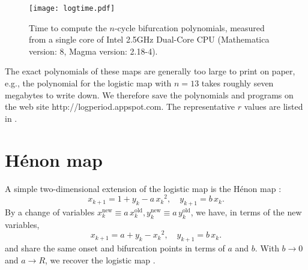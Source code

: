 \documentclass{ws-ijbc}
\begin{document}
\begin{figure}[h]
  \begin{center}
  \begin{minipage}{\linewidth}
        \texttt{[image: logtime.pdf]}
  \end{minipage}%
  \end{center}
  \caption{\label{fig:logtime}
  Time to compute the $n$-cycle bifurcation polynomials,
    measured from a single core of
    Intel\textsuperscript{\textregistered} 2.5GHz Dual-Core CPU
  (Mathematica version: 8, Magma version: 2.18-4).
  }
\end{figure}
%






%
The exact polynomials of these maps are generally too large to print on paper,
  e.g., the polynomial for the logistic map with $n = 13$
    takes roughly seven megabytes to write down.
%
We therefore save the polynomials and programs on the web site
http://logperiod.appspot.com.
%
The representative $r$ values are listed in .






\section{\label{sec:henon}H\'enon map}




A simple two-dimensional extension of the logistic map
  is the H\'enon map \cite{henon}:
\begin{equation}
  x_{k+1} = 1 + y_k - a \, {x_k}^2, \quad
  y_{k+1} = b \, x_k.
\label{eq:henon}
\end{equation}
%
By a change of variables
  $x_k^\mathrm{new} \equiv a \, x_k^\mathrm{old},
   y_k^\mathrm{new} \equiv a \, y_k^\mathrm{old}$,
we have, in terms of the new variables,
\begin{equation}
  x_{k+1} = a + y_k - {x_k}^2, \quad
  y_{k+1} = b \, x_k.
\label{eq:henons}
\end{equation}
%
 and  share the
same onset and bifurcation points
in terms of $a$ and $b$.
%
With $b \rightarrow 0$ and $a \rightarrow R$,
we recover the logistic map .
\end{document}
